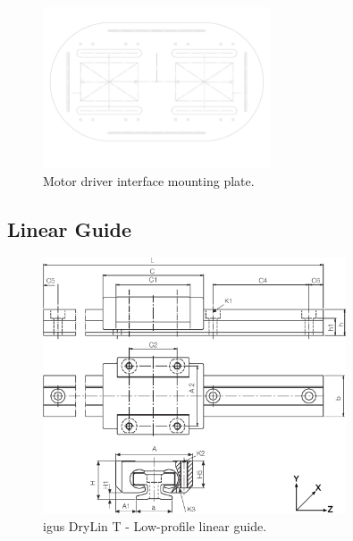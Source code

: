 \begin{figure}
\centering
\includegraphics[width=0.6\textwidth]{images/mechanical/driver-mount-plate.pdf} 
\caption{Motor driver interface mounting plate.}
\label{fig:Motor driver interface mounting plate}
\end{figure}

\subsection{Linear Guide}
\begin{figure}
\centering
\includegraphics[width=0.8\textwidth]{images/mechanical/drylin-linear-guide.png} 
\caption{igus DryLin T - Low-profile linear guide.}
\label{fig:drylin-linear-guide}
\end{figure}

